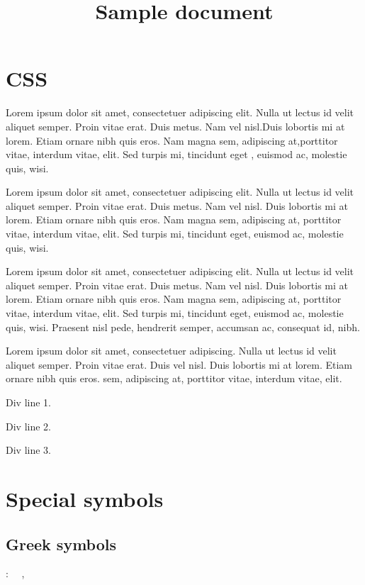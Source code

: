 \documentclass{article}
\title{Sample document}
\begin{document}
\maketitle
\section{CSS}
\par Lorem ipsum dolor sit amet, consectetuer adipiscing elit.
 Nulla ut lectus id velit aliquet semper. Proin vitae erat. Duis metus. Nam
 vel nisl.Duis lobortis mi at lorem. Etiam ornare nibh quis eros. Nam magna 
sem, adipiscing at,porttitor vitae, interdum vitae, elit. Sed turpis mi,
 tincidunt eget , euismod ac, molestie quis, wisi.
  
\par Lorem ipsum dolor sit amet, consectetuer adipiscing elit.
 Nulla ut lectus id velit aliquet semper. Proin vitae erat. Duis metus. Nam
 vel nisl. Duis lobortis mi at lorem. Etiam ornare nibh quis eros. Nam magna 
sem, adipiscing at, porttitor vitae, interdum vitae, elit. Sed turpis mi,
 tincidunt eget, euismod ac, molestie quis, wisi.
  
\par Lorem ipsum dolor sit amet, consectetuer adipiscing elit.
 Nulla ut lectus id velit aliquet semper. Proin vitae erat. Duis metus. Nam
 vel nisl. Duis lobortis mi at lorem. Etiam ornare nibh quis eros. Nam magna 
sem, adipiscing at, porttitor vitae, interdum vitae, elit. Sed turpis mi,
 tincidunt eget, euismod ac, molestie quis, wisi. Praesent nisl pede,
 hendrerit semper, accumsan ac, consequat id, nibh.
\par Lorem ipsum dolor sit amet, consectetuer adipiscing.
 Nulla ut lectus id velit aliquet semper. Proin vitae erat. Duis
 vel nisl. Duis lobortis mi at lorem. Etiam ornare nibh quis eros. 
sem, adipiscing at, porttitor vitae, interdum vitae, elit.
\par Div line 1. 
\par Div line 2. 
\par Div line 3.

\section{Special symbols}
\subsection{Greek symbols}
\par {}: \ \Alpha \  , \ \Gamma \ \ \Theta \ \ \Xi \ \ \Pi \ 
\end{document}
